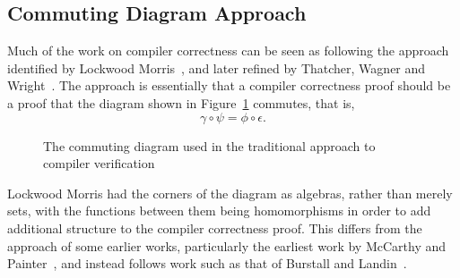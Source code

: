 \documentclass[a4paper,10pt]{article}
\begin{document}
\subsection{Commuting Diagram Approach}
\label{commuting-diagram-sec}

Much of the work on compiler correctness can be seen as following the approach
identified by Lockwood Morris~\cite{morris1973}, and later refined by Thatcher,
Wagner and Wright~\cite{thatcher1979}. The approach is essentially that a
compiler correctness proof should be a proof that the diagram shown in
Figure~\ref{commuting-diagram} commutes, that is,
\begin{displaymath}
  \gamma \circ \psi = \phi \circ \epsilon .
\end{displaymath}

\begin{figure}[ht]
  \begin{center}
  \end{center}
  \caption{The commuting diagram used in the traditional approach to compiler verification}
  \label{commuting-diagram}
\end{figure}

Lockwood Morris had the corners of the diagram as algebras, rather than merely
sets, with the functions between them being homomorphisms in order to add
additional structure to the compiler correctness proof.  This differs from the
approach of some earlier works, particularly the earliest work by McCarthy and
Painter~\cite{mccarthy1967}, and instead follows work such as that of Burstall
and Landin~\cite{burstall1969}.
\end{document}
